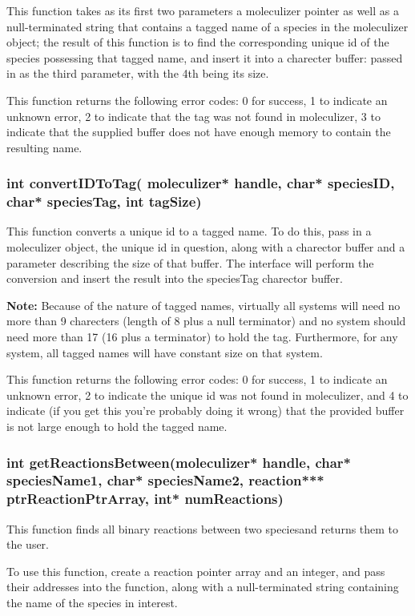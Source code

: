 This function takes as its first two parameters a moleculizer pointer
as well as a null-terminated string that contains a tagged name of a
species in the moleculizer object; the result of this function is to
find the corresponding unique id of the species possessing that tagged
name, and insert it into a charecter buffer: passed in as the third
parameter, with the 4th being its size.

This function returns the following error codes: 0 for success, 1 to
indicate an unknown error, 2 to indicate that the tag was not found in
moleculizer, 3 to indicate that the supplied buffer does not have
enough memory to contain the resulting name.

\subsubsection{int convertIDToTag( moleculizer* handle, char*
  speciesID, char* speciesTag, int tagSize)}
This function converts a unique id to a tagged name.  To do this, pass
in a moleculizer object, the unique id in question, along with a
charector buffer and a parameter describing the size of that buffer.
The interface will perform the conversion and insert the result into
the speciesTag charector buffer.

\textbf{Note:} Because of the nature of tagged names, virtually all
systems will need no more than 9 charecters (length of 8 plus a null
terminator) and no system should need more than 17 (16 plus a
terminator) to hold the tag.  Furthermore, for any system, all tagged
names will have constant size on that system. 

This function returns the following error codes: 0 for success, 1 to
indicate an unknown error, 2 to indicate the unique id was not found
in moleculizer, and 4 to indicate (if you get this you're probably
doing it wrong) that the provided buffer is not large enough to hold
the tagged name.

\subsubsection{int getReactionsBetween(moleculizer* handle, char*
  speciesName1, char* speciesName2, reaction*** ptrReactionPtrArray,
  int* numReactions)}

This function finds all binary reactions between two speciesand returns them to the user.

To use this function, create a reaction pointer array and an integer,
and pass their addresses into the function, along with a
null-terminated string containing the name of the species in
interest.  

